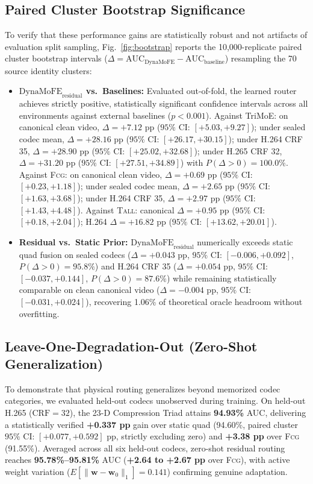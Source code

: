 \documentclass[conference]{IEEEtran}
\newcommand{\tall}{\textsc{Tall}}
\newcommand{\fcg}{\textsc{Fcg}}
\newcommand{\auc}{AUC}
\newcommand{\pp}{pp}
\begin{document}
\subsection{Paired Cluster Bootstrap Significance}
To verify that these performance gains are statistically robust and not artifacts of evaluation split sampling, Fig.~\ref{fig:bootstrap} reports the 10,000-replicate paired cluster bootstrap intervals ($\Delta = \text{AUC}_{\text{DynaMoFE}} - \text{AUC}_{\text{baseline}}$) resampling the 70 source identity clusters:
\begin{itemize}
    \item \textbf{$\text{DynaMoFE}_{\text{residual}}$ vs.\ Baselines:} Evaluated out-of-fold, the learned router achieves strictly positive, statistically significant confidence intervals across all environments against external baselines ($p < 0.001$). Against TriMoE: on canonical clean video, $\Delta = +7.12$ \pp{} ($95\%$ CI: $[+5.03, +9.27]$); under sealed codec mean, $\Delta = +28.16$ \pp{} ($95\%$ CI: $[+26.17, +30.15]$); under H.264 CRF 35, $\Delta = +28.90$ \pp{} ($95\%$ CI: $[+25.02, +32.68]$); under H.265 CRF 32, $\Delta = +31.20$ \pp{} ($95\%$ CI: $[+27.51, +34.89]$) with $P(\Delta > 0) = 100.0\%$. Against \fcg{}: on canonical clean video, $\Delta = +0.69$ \pp{} ($95\%$ CI: $[+0.23, +1.18]$); under sealed codec mean, $\Delta = +2.65$ \pp{} ($95\%$ CI: $[+1.63, +3.68]$); under H.264 CRF 35, $\Delta = +2.97$ \pp{} ($95\%$ CI: $[+1.43, +4.48]$). Against \tall{}: canonical $\Delta = +0.95$ \pp{} ($95\%$ CI: $[+0.18, +2.04]$); H.264 $\Delta = +16.82$ \pp{} ($95\%$ CI: $[+13.62, +20.01]$).

    \item \textbf{Residual vs.\ Static Prior:} $\text{DynaMoFE}_{\text{residual}}$ numerically exceeds static quad fusion on sealed codecs ($\Delta = +0.043$ \pp{}, $95\%$ CI: $[-0.006, +0.092]$, $P(\Delta > 0) = 95.8\%$) and H.264 CRF 35 ($\Delta = +0.054$ \pp{}, $95\%$ CI: $[-0.037, +0.144]$, $P(\Delta > 0) = 87.6\%$) while remaining statistically comparable on clean canonical video ($\Delta = -0.004$ \pp{}, $95\%$ CI: $[-0.031, +0.024]$), recovering 1.06\% of theoretical oracle headroom without overfitting.
\end{itemize}

\subsection{Leave-One-Degradation-Out (Zero-Shot Generalization)}
To demonstrate that physical routing generalizes beyond memorized codec categories, we evaluated held-out codecs unobserved during training. On held-out H.265 ($\text{CRF}=32$), the 23-D Compression Triad attains \textbf{94.93\%} \auc{}, delivering a statistically verified \textbf{+0.337 \pp{}} gain over static quad (94.60\%, paired cluster $95\%$ CI: $[+0.077, +0.592]$ \pp{}, strictly excluding zero) and \textbf{+3.38 \pp{}} over \fcg{} (91.55\%). Averaged across all six held-out codecs, zero-shot residual routing reaches \textbf{95.78\%--95.81\%} \auc{} (\textbf{+2.64 to +2.67 \pp{}} over \fcg{}), with active weight variation ($E[\|\mathbf{w} - \mathbf{w}_0\|_1] = 0.141$) confirming genuine adaptation.
\end{document}
